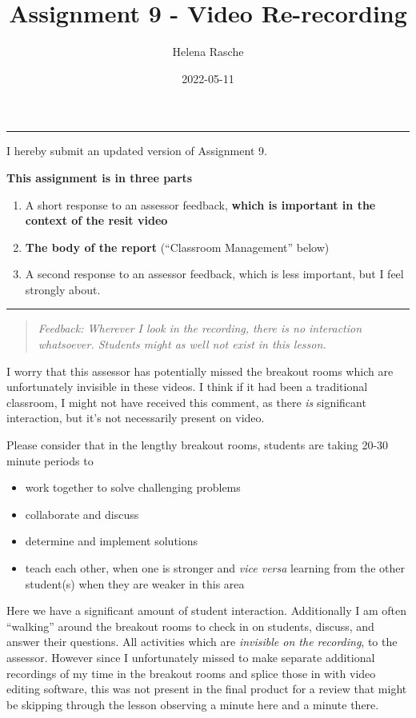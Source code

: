 \documentclass[paper=a4,justified,a4paper]{tufte-handout}
\title[A9 - Video Re-recording]{Assignment 9 - Video Re-recording}
\author{Helena Rasche}
\date{2022-05-11}
\providecommand{\tightlist}{%
  \setlength{\itemsep}{0pt}\setlength{\parskip}{0pt}}
\begin{document}
\maketitle
\noindent\rule{5in}{0.4pt}


I hereby submit an updated version of Assignment 9.

\textbf{This assignment is in three parts}

\begin{enumerate}
\def\labelenumi{\arabic{enumi}.}
\tightlist
\item
  A short response to an assessor feedback, \textbf{which is important
  in the context of the resit video}
\item
  \textbf{The body of the report} (``Classroom Management'' below)
\item
  A second response to an assessor feedback, which is less important,
  but I feel strongly about.
\end{enumerate}

\begin{center}\rule{0.5\linewidth}{0.5pt}\end{center}

\begin{quote}
\emph{Feedback: Wherever I look in the recording, there is no
interaction whatsoever. Students might as well not exist in this
lesson.}
\end{quote}

I worry that this assessor has potentially missed the breakout rooms
which are unfortunately invisible in these videos. I think if it had
been a traditional classroom, I might not have received this comment, as
there \emph{is} significant interaction, but it's not necessarily
present on video.

Please consider that in the lengthy breakout rooms, students are taking
20-30 minute periods to

\begin{itemize}
\tightlist
\item
  work together to solve challenging problems
\item
  collaborate and discuss
\item
  determine and implement solutions
\item
  teach each other, when one is stronger and \emph{vice versa} learning
  from the other student(s) when they are weaker in this area
\end{itemize}

Here we have a significant amount of student interaction. Additionally I
am often ``walking'' around the breakout rooms to check in on students,
discuss, and answer their questions. All activities which are
\emph{invisible on the recording}, to the assessor. However since I
unfortunately missed to make separate additional recordings of my time
in the breakout rooms and splice those in with video editing software,
this was not present in the final product for a review that might be
skipping through the lesson observing a minute here and a minute there.
\end{document}
